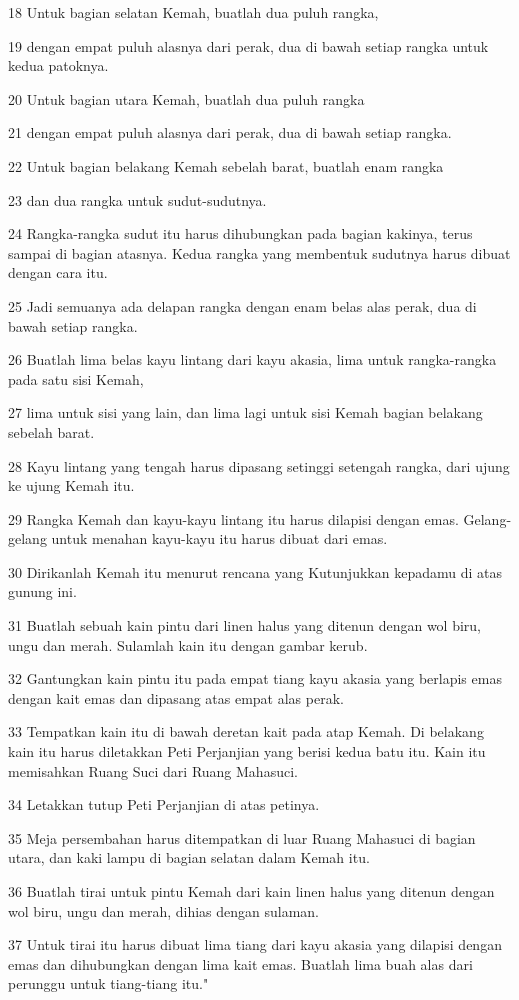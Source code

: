 \par 18 Untuk bagian selatan Kemah, buatlah dua puluh rangka,
\par 19 dengan empat puluh alasnya dari perak, dua di bawah setiap rangka untuk kedua patoknya.
\par 20 Untuk bagian utara Kemah, buatlah dua puluh rangka
\par 21 dengan empat puluh alasnya dari perak, dua di bawah setiap rangka.
\par 22 Untuk bagian belakang Kemah sebelah barat, buatlah enam rangka
\par 23 dan dua rangka untuk sudut-sudutnya.
\par 24 Rangka-rangka sudut itu harus dihubungkan pada bagian kakinya, terus sampai di bagian atasnya. Kedua rangka yang membentuk sudutnya harus dibuat dengan cara itu.
\par 25 Jadi semuanya ada delapan rangka dengan enam belas alas perak, dua di bawah setiap rangka.
\par 26 Buatlah lima belas kayu lintang dari kayu akasia, lima untuk rangka-rangka pada satu sisi Kemah,
\par 27 lima untuk sisi yang lain, dan lima lagi untuk sisi Kemah bagian belakang sebelah barat.
\par 28 Kayu lintang yang tengah harus dipasang setinggi setengah rangka, dari ujung ke ujung Kemah itu.
\par 29 Rangka Kemah dan kayu-kayu lintang itu harus dilapisi dengan emas. Gelang-gelang untuk menahan kayu-kayu itu harus dibuat dari emas.
\par 30 Dirikanlah Kemah itu menurut rencana yang Kutunjukkan kepadamu di atas gunung ini.
\par 31 Buatlah sebuah kain pintu dari linen halus yang ditenun dengan wol biru, ungu dan merah. Sulamlah kain itu dengan gambar kerub.
\par 32 Gantungkan kain pintu itu pada empat tiang kayu akasia yang berlapis emas dengan kait emas dan dipasang atas empat alas perak.
\par 33 Tempatkan kain itu di bawah deretan kait pada atap Kemah. Di belakang kain itu harus diletakkan Peti Perjanjian yang berisi kedua batu itu. Kain itu memisahkan Ruang Suci dari Ruang Mahasuci.
\par 34 Letakkan tutup Peti Perjanjian di atas petinya.
\par 35 Meja persembahan harus ditempatkan di luar Ruang Mahasuci di bagian utara, dan kaki lampu di bagian selatan dalam Kemah itu.
\par 36 Buatlah tirai untuk pintu Kemah dari kain linen halus yang ditenun dengan wol biru, ungu dan merah, dihias dengan sulaman.
\par 37 Untuk tirai itu harus dibuat lima tiang dari kayu akasia yang dilapisi dengan emas dan dihubungkan dengan lima kait emas. Buatlah lima buah alas dari perunggu untuk tiang-tiang itu."

